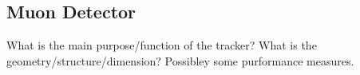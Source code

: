 \subsection{Muon Detector}

What is the main purpose/function of the tracker?
What is the geometry/structure/dimension?
Possibley some purformance measures.

